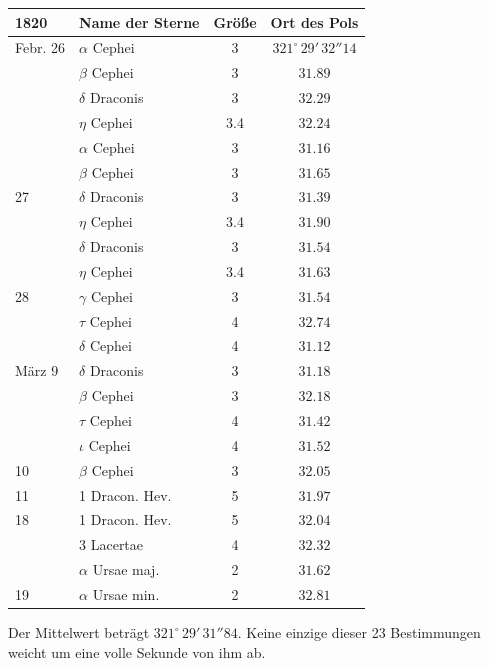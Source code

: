 \begin{center}
\begin{tabular}{l|l|c|c}
1820 & Name der Sterne & Größe & Ort des Pols \\
\hline
Febr. 26 & $\alpha$ Cephei & 3 & $321^\circ\,29'\,32''14$ \\
 & $\beta$ Cephei & 3 & $31.89$ \\
 & $\delta$ Draconis & 3 & $32.29$ \\
 & $\eta$ Cephei & 3.4 & $32.24$ \\
 & $\alpha$ Cephei & 3 & $31.16$ \\
 & $\beta$ Cephei & 3 & $31.65$ \\
27 & $\delta$ Draconis & 3 & $31.39$ \\
 & $\eta$ Cephei & 3.4 & $31.90$ \\
 & $\delta$ Draconis & 3 & $31.54$ \\
 & $\eta$ Cephei & 3.4 & $31.63$ \\
28 & $\gamma$ Cephei & 3 & $31.54$ \\
 & $\tau$ Cephei & 4 & $32.74$ \\
 & $\delta$ Cephei & 4 & $31.12$ \\
März 9 & $\delta$ Draconis & 3 & $31.18$ \\
 & $\beta$ Cephei & 3 & $32.18$ \\
 & $\tau$ Cephei & 4 & $31.42$ \\
 & $\iota$ Cephei & 4 & $31.52$ \\
10 & $\beta$ Cephei & 3 & $32.05$ \\
11 & 1 Dracon. Hev. & 5 & $31.97$ \\
18 & 1 Dracon. Hev. & 5 & $32.04$ \\
 & 3 Lacertae & 4 & $32.32$ \\
 & $\alpha$ Ursae maj. & 2 & $31.62$ \\
19 & $\alpha$ Ursae min. & 2 & $32.81$ \\
\end{tabular}
\end{center}

\par\indent Der Mittelwert beträgt $321^\circ\,29'\,31''84$. Keine einzige dieser 23 Bestimmungen weicht um eine volle Sekunde von ihm ab.

